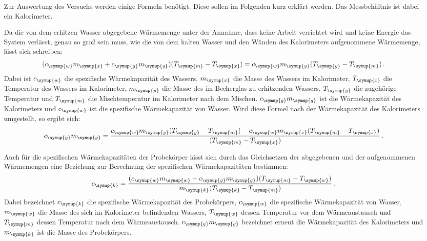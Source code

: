 Zur Auswertung des Versuchs werden einige Formeln benötigt. Diese sollen im Folgenden kurz
erklärt werden. Das Messbehältnis ist dabei ein Kalorimeter.

Da die von dem erhitzen Wasser abgegebene Wärmemenge unter der Annahme, dass keine
Arbeit verrichtet wird und keine Energie das System verlässt, genau so groß sein
muss, wie die von dem kalten Wasser und den Wänden des Kalorimeters aufgenommene
Wärmemenge, lässt sich schreiben:
\begin{equation}
  (c_{\symup{w}}m_{\symup{x}}+c_{\symup{g}}m_{\symup{g}})(T_{\symup{m}}-T_{\symup{x}})
  =c_{\symup{w}}m_{\symup{y}}(T_{\symup{y}}-T_{\symup{m}}) \,.
\end{equation}
Dabei ist $c_{\symup{w}}$ die spezifische Wärmekapazität des Wassers,
$m_{\symup{x}}$ die Masse des Wassers im Kalorimeter, $T_{\symup{x}}$ die
Temperatur des Wassers im Kalorimeter, $m_{\symup{y}}$ die Masse des
im Becherglas zu erhitzenden Wassers, $T_{\symup{y}}$ die zugehörige Temperatur
und $T_{\symup{m}}$ die Mischtemperatur im Kalorimeter nach dem Mischen. $c_{\symup{g}}m_{\symup{g}}$
ist die Wärmekapazität des Kalorimeters und $c_{\symup{w}}$ ist die spezifische Wärmekapazität
von Wasser.
Wird diese Formel nach der Wärmekapazität des Kalorimeters umgestellt, so ergibt sich:
\begin{equation}
  c_{\symup{g}}m_{\symup{g}}=\frac{c_{\symup{w}}m_{\symup{y}}(T_{\symup{y}}-T_{\symup{m}})
  -c_{\symup{w}}m_{\symup{x}}(T_{\symup{m}}-T_{\symup{x}})}{(T_{\symup{m}}-T_{\symup{x}})} \,.
  \label{eqn:kalorimeter}
\end{equation}

Auch für die spezifischen Wärmekapazitäten der Probekörper lässt sich durch das Gleichsetzen der abgegebenen und der aufgenommenen
Wärmemengen eine Beziehung zur Berechnung der spezifischen Wärmekapazitäten bestimmen:
\begin{equation}
  c_{\symup{k}}=\frac{(c_{\symup{w}}m_{\symup{w}}+c_{\symup{g}}m_{\symup{g}})
  (T_{\symup{m}}-T_{\symup{w}})}{m_{\symup{k}}(T_{\symup{k}}-T_{\symup{m}})}\,.
  \label{eqn:proben}
\end{equation}
Dabei bezeichnet $c_{\symup{k}}$ die spezifische Wärmekapazität des Probekörpers,
$c_{\symup{w}}$ die spezifische Wärmekapazität von Wasser, $m_{\symup{w}}$ die
Masse des sich im Kalorimeter befindenden Wassers, $T_{\symup{w}}$ dessen Temperatur
vor dem Wärmeaustausch und $T_{\symup{m}}$ dessen Temperatur nach dem Wärmeaustausch.
$c_{\symup{g}}m_{\symup{g}}$ bezeichnet erneut die Wärmekapazität des Kalorimeters
und $m_{\symup{k}}$ ist die Masse des Probekörpers.
